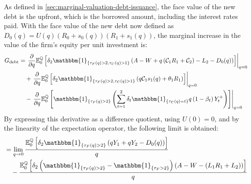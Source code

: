 \documentclass[main.tex]{subfiles}
\begin{document}
        As defined in \cref{sec:marginal-valuation-debt-issuance},
        the face value of the new debt is the upfront,
        which is the borrowed amount, including the interest rates paid.
        With the face value of the new debt now defined as $D_{0}(q) = U(q)(R_{0} + s_{0}(q))(R_{1} + s_{1}(q))$,
        the marginal increase in the value of the firm's equity per unit investment is:
        \begin{align}
            G_{\text{debt}} &=
            \left.\frac{\partial}{\partial q}
            \mathbb{E}_{0}^{\rnmeasure}\left[
                \delta_{2} \mathbbm{1}_{\{\tau_{F}(q)>2,\tau_{C}(q)>1\}}
                \left(
                    A - W
                    + q\left(\mathcal{C}_{1} R_{1} + \mathcal{C}_{2}\right)
                    - L_{2}
                    - D_{0}(q)
                \right)
            \right]\right\rvert_{q=0}
            \nonumber
            \\
            &\quad+
            \left.\frac{\partial}{\partial q}
            \mathbb{E}_{0}^{\rnmeasure}\left[
                \delta_2 \mathbbm{1}_{\{\tau_{F}(q)>2,\tau_{C}(q)>1\}}
                \left(q\mathcal{C}_{1} s_1(q) + \theta_{1}R_{1}\right)
            \right]\right\rvert_{q=0}
            \nonumber
            \\
            &\quad-
            \left.\frac{\partial}{\partial q}
            \mathbb{E}_{0}^{\rnmeasure}\left[
                \mathbbm{1}_{\{\tau_{F}(q)>2\}}
                \left(
                    \sum_{t=1}^{2} \delta_{t} \mathbbm{1}_{\{\tau_{C}(q)=t\}}q\left(1-\beta_t\right)Y_{t}^{+}
                \right)
            \right]\right\rvert_{q=0}
        \end{align}
        By expressing this derivative as a difference quotient, using $U(0)=0$,
        and by the linearity of the expectation operator,
        the following limit is obtained:
        \begin{align*}
            &=
            \lim_{q \rightarrow 0}
            \frac{
                \mathbb{E}_{0}^{\rnmeasure}\left[
                    \delta_{2} \mathbbm{1}_{\{\tau_{F}(q)>2\}}
                    \left(
                        qY_{1} + qY_{2}
                        - D_{0}(q)
                    \right)
                \right]
            }{
                q
            }
            \\
            &\quad-
            \frac{
                \mathbb{E}_{0}^{\rnmeasure}\left[
                    \delta_{2} 
                    \left(\mathbbm{1}_{\{\tau_{F}(q)>2\}} - \mathbbm{1}_{\{\tau_{F}>2\}}\right)
                    \left(
                        A - W
                        - \left(L_{1}R_{1} + L_{2}\right)
                    \right)
                \right]
            }{
                q
            }
        \end{align*}
\end{document}
